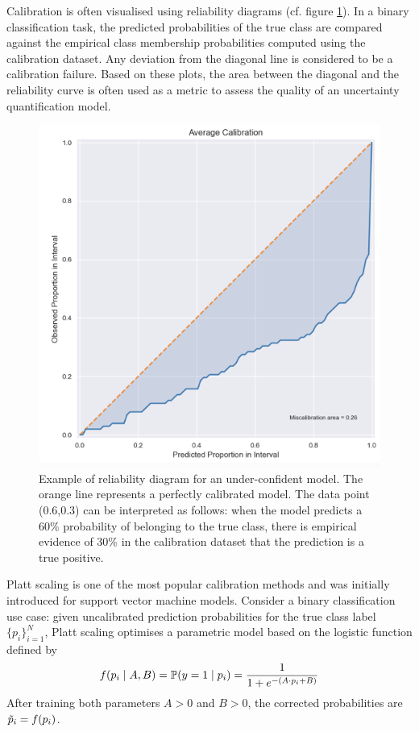 Calibration is often visualised using reliability diagrams (cf. figure \ref{fig:calibration-example}). In a binary classification task, the predicted probabilities of the true class are compared against the empirical class membership probabilities computed using the calibration dataset. Any deviation from the diagonal line is considered to be a calibration failure. Based on these plots, the area between the diagonal and the reliability curve is often used as a metric to assess the quality of an uncertainty quantification model.
\begin{figure}
    \centering
    \includegraphics[scale=0.58]{figures/related_work/calibration.png}
    \caption{Example of reliability diagram for an under-confident model. The orange line represents a perfectly calibrated model. The data point (0.6,0.3) can be interpreted as follows: when the model predicts a 60\% probability of belonging to the true class, there is empirical evidence of 30\% in the calibration dataset that the prediction is a true positive.}
    \label{fig:calibration-example}
\end{figure}

Platt scaling is one of the most popular calibration methods and was initially introduced for support vector machine models. Consider a binary classification use case: given uncalibrated prediction probabilities for the true class label $\{ p_i \}_{i=1}^N$, Platt scaling optimises a parametric model based on the logistic function defined by
$$
f(p_i \mid A, B) = \operatorname{\mathbb{P}}( y = 1 \mid p_i) = \frac{1}{1 + e^{- (A \cdot p_i + B)}}
$$
After training both parameters $A > 0$ and $B > 0$, the corrected probabilities are $\Tilde p_i = f(p_i)$.

